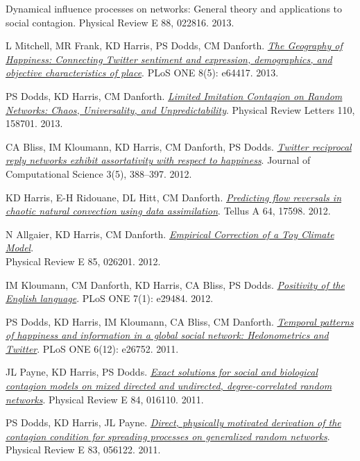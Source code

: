 \documentclass[margin,line]{res}
\begin{document}
\begin{resume}
{\begin{etaremune}
{      {Dynamical influence processes on networks:
          General theory and applications to social contagion}}.
      Physical Review E 88, 022816. 2013.
    \item L Mitchell, MR Frank, KD Harris, PS Dodds, CM Danforth.
      \textit{\href{https://arxiv.org/abs/1302.3299}
      {The Geography of Happiness:
          Connecting Twitter sentiment and expression,
          demographics, and objective characteristics of place}}.
      PLoS ONE 8(5): e64417. 2013.
    \item PS Dodds, KD Harris, CM Danforth.
      \href{https://arxiv.org/abs/1208.0255}
      {\textit{Limited Imitation Contagion on Random Networks: 
          Chaos, Universality, and Unpredictability}}.
      Physical Review Letters 110, 158701. 2013.
    \item CA Bliss, IM Kloumann, KD Harris, CM Danforth, PS Dodds.
      \href{https://arxiv.org/abs/1112.1010}
      {\textit{Twitter reciprocal reply networks exhibit
          assortativity with respect to happiness}}.
      Journal of Computational Science 3(5), 388--397. 2012.
    \item KD Harris, E-H Ridouane, DL Hitt, CM Danforth.
      \href{https://arxiv.org/abs/1108.5685}
      {\textit{ Predicting flow reversals in chaotic natural
          convection using data assimilation}}.
      Tellus A 64, 17598. 2012.
    \item N Allgaier, KD Harris, CM Danforth.
      \href{https://arxiv.org/abs/1107.2690}
      {\textit{Empirical Correction of a Toy Climate Model}}. \\
      Physical Review E 85, 026201. 2012.
    \item IM Kloumann, CM Danforth, KD Harris, CA Bliss, PS Dodds.
      \href{https://arxiv.org/abs/1108.5192}
      {\textit{Positivity of the English language}}.
      PLoS ONE 7(1): e29484. 2012.
    \item PS Dodds, KD Harris, IM Kloumann, CA Bliss, CM Danforth.
      \href{https://arxiv.org/abs/1101.5120}
      {\textit{Temporal patterns of happiness and information in a 
          global social network:
          Hedonometrics and Twitter}}. 
      PLoS ONE 6(12): e26752. 2011.
    \item JL Payne, KD Harris, PS Dodds.
      \href{https://arxiv.org/abs/1103.0056}
      {\textit{Exact solutions for social and biological contagion models 
          on mixed directed and undirected, degree-correlated random networks}}.
      Physical Review E 84, 016110. 2011.
    \item PS Dodds, KD Harris, JL Payne.
      \href{https://arxiv.org/abs/1101.5591}
      {\textit{Direct, physically motivated derivation of the contagion
          condition for spreading processes on generalized random networks}}.
      Physical Review E 83, 056122. 2011.
    \end{etaremune}
  }


\end{resume}
\end{document}
